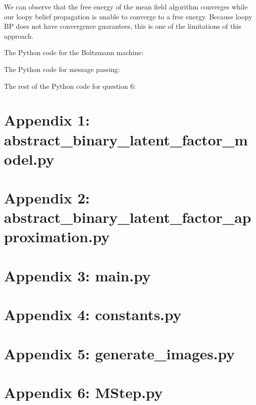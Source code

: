 \documentclass[12pt]{article}
\begin{document}
We can observe that the free energy of the mean field algorithm converges while our loopy belief propagation is unable to converge to a free energy. Because loopy BP does not have convergence guarantees, this is one of the limitations of this approach.

\newpage
The Python code for the Boltzmann machine:


\newpage
The Python code for message passing:


\newpage
The rest of the Python code for question 6:


\newpage
\section*{Appendix 1: abstract\_binary\_latent\_factor\_model.py}


\newpage
\section*{Appendix 2: abstract\_binary\_latent\_factor\_approximation.py}


\newpage
\section*{Appendix 3: main.py}


\newpage
\section*{Appendix 4: constants.py}


\newpage
\section*{Appendix 5: generate\_images.py}

\newpage
\section*{Appendix 6: MStep.py}

\end{document}
